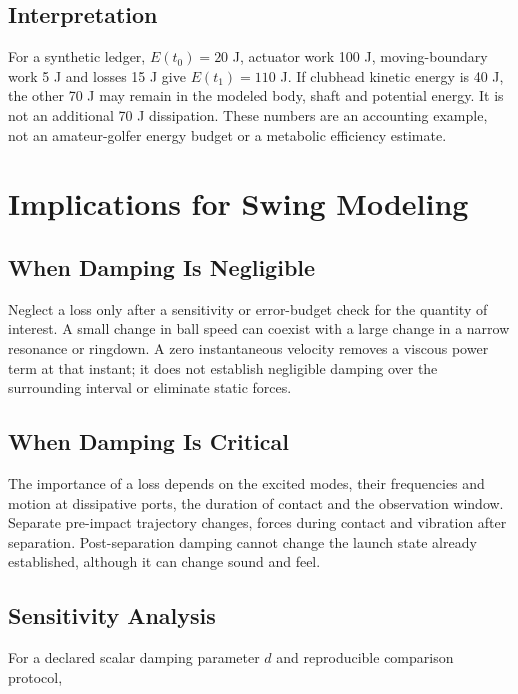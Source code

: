 \subsection{Interpretation}\label{interpretation}

For a synthetic ledger, \(E(t_0)=20\) J, actuator work 100 J, moving-boundary work 5 J and losses 15 J give \(E(t_1)=110\) J. If clubhead kinetic energy is 40 J, the other 70 J may remain in the modeled body, shaft and potential energy. It is not an additional 70 J dissipation. These numbers are an accounting example, not an amateur-golfer energy budget or a metabolic efficiency estimate.

\section{Implications for Swing
Modeling}\label{implications-for-swing-modeling}

\subsection{When Damping Is
Negligible}\label{when-damping-is-negligible}

Neglect a loss only after a sensitivity or error-budget check for the quantity of interest. A small change in ball speed can coexist with a large change in a narrow resonance or ringdown. A zero instantaneous velocity removes a viscous power term at that instant; it does not establish negligible damping over the surrounding interval or eliminate static forces.

\subsection{When Damping Is Critical}\label{when-damping-is-critical}

The importance of a loss depends on the excited modes, their frequencies and motion at dissipative ports, the duration of contact and the observation window. Separate pre-impact trajectory changes, forces during contact and vibration after separation. Post-separation damping cannot change the launch state already established, although it can change sound and feel.

\subsection{Sensitivity Analysis}\label{sensitivity-analysis}

For a declared scalar damping parameter \(d\) and reproducible comparison protocol,

